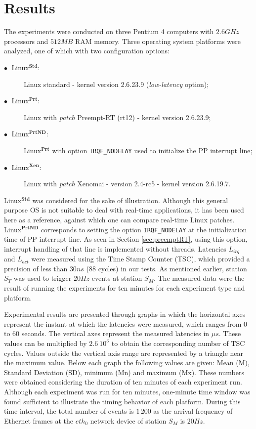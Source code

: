 \documentclass{acm_proc_article-sp}
\newcommand{\cod}[1]{\hspace{0.1cm}\texttt{#1}}
\newcommand{\ing}[1]{\emph{#1}}
\newcommand{\preemptt}{{Preempt-RT }}
\begin{document}
\section{Results}
\label{cap:platEstud}

The experiments were conducted on three Pentium 4 computers with $2.6 GHz$
processors and $512 MB$ RAM memory. Three operating system platforms were analyzed,
one of which with two configuration options:

\begin{description}
\item[$\bullet \;$ Linux$^{\mathbf{Std}}$:] Linux standard - kernel version 2.6.23.9
  (\ing{low-latency} option);
\item[$\bullet \;$ Linux$^{\mathbf{Prt}}$:] Linux with \ing{patch}
  \preemptt (rt12) - kernel version 2.6.23.9;
\item[$\bullet \;$ Linux$^{\mathbf{PrtND}}$:] Linux$^{\mathbf{Prt}}$ with option
  \cod{IRQF\_NODELAY} used to initialize the PP interrupt line;
\item[$\bullet \;$ Linux$^{\mathbf{Xen}}$:] Linux with \ing{patch} Xenomai - version
  2.4-rc5 - kernel version 2.6.19.7.
\end{description}

Linux$^{\mathbf{Std}}$ was considered for the sake of illustration. Although this
general purpose OS is not suitable to deal with real-time applications, it has been
used here as a reference, against which one can compare real-time Linux
patches. Linux$^{\mathbf{PrtND}}$ corresponds to setting the option
\cod{IRQF\_NODELAY} at the initialization time of PP interrupt line. As seen in
Section \ref{sec:preemptRT}, using this option, interrupt handling of that line is
implemented without threads.  Latencies $L_{irq}$ and $L_{act}$ were measured using
the Time Stamp Counter (TSC), which provided a precision of less than $30 ns$ (88
cycles) in our tests.  As mentioned earlier, station $S_T$ was used to trigger
$20Hz$ events at station $S_M$.  The measured data were the result of running the
experiments for ten minutes for each experiment type and platform.

Experimental results are presented through graphs in which the horizontal axes
represent the instant at which the latencies were measured, which ranges from 0 to
60 seconds.  The vertical axes represent the measured latencies in $\mu s$. These
values can be multiplied by $2.6\:10^3$ to obtain the corresponding number of TSC
cycles.  Values outside the vertical axis range are represented by a triangle near
the maximum value.  Below each graph the following values are given: Mean (M),
Standard Deviation (SD), minimum (Mn) and maximum (Mx). These numbers were obtained
considering the duration of ten minutes of each experiment run. Although each
experiment was run for ten minutes, one-minute time window was found sufficient to
illustrate the timing behavior of each platform.  During this time interval, the
total number of events is $1\,200$ as the arrival frequency of Ethernet frames at the
$eth_0$ network device of station $S_M$ is $20 Hz$.
\end{document}
